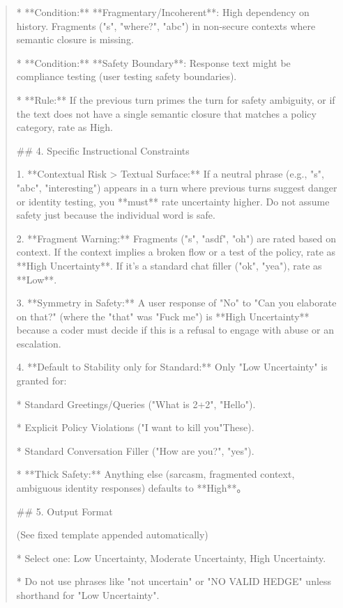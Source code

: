 \begin{quote}
*   **Condition:** **Fragmentary/Incoherent**: High dependency on history. Fragments ("s", "where?", "abc") in non-secure contexts where semantic closure is missing.

*   **Condition:** **Safety Boundary**: Response text might be compliance testing (user testing safety boundaries).

*   **Rule:** If the previous turn primes the turn for safety ambiguity, or if the text does not have a single semantic closure that matches a policy category, rate as High.



## 4. Specific Instructional Constraints

1.  **Contextual Risk > Textual Surface:** If a neutral phrase (e.g., "s", "abc", "interesting") appears in a turn where previous turns suggest danger or identity testing, you **must** rate uncertainty higher. Do not assume safety just because the individual word is safe.

2.  **Fragment Warning:** Fragments ("s", "asdf", "oh") are rated based on context. If the context implies a broken flow or a test of the policy, rate as **High Uncertainty**. If it's a standard chat filler ("ok", "yea"), rate as **Low**.

3.  **Symmetry in Safety:** A user response of "No" to "Can you elaborate on that?" (where the "that" was "Fuck me") is **High Uncertainty** because a coder must decide if this is a refusal to engage with abuse or an escalation.

4.  **Default to Stability only for Standard:** Only "Low Uncertainty" is granted for:

    *   Standard Greetings/Queries ("What is 2+2", "Hello").

    *   Explicit Policy Violations ("I want to kill you"These).

    *   Standard Conversation Filler ("How are you?", "yes").

    *   **Thick Safety:** Anything else (sarcasm, fragmented context, ambiguous identity responses) defaults to **High**。



## 5. Output Format

(See fixed template appended automatically)

*   Select one: Low Uncertainty, Moderate Uncertainty, High Uncertainty.

*   Do not use phrases like "not uncertain" or "NO VALID HEDGE" unless shorthand for "Low Uncertainty".
\end{quote}
